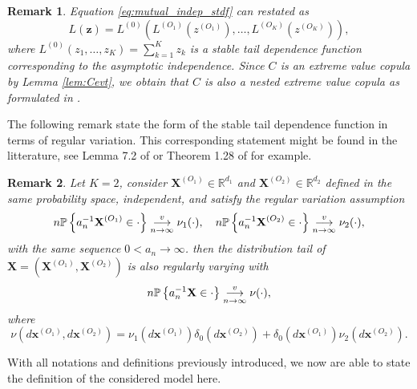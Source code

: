 \documentclass[11pt]{article}
\newtheorem{remark}{Remark}
\begin{document}
	\begin{remark}
		Equation \eqref{eq:mutual_indep_stdf} can restated as 
		\begin{equation*}
			L(\textbf{z}) = L^{(0)} \left(L^{(O_1)}\left(z^{(O_1)}\right), \dots, L^{(O_K)}\left(z^{(O_K)}\right) \right),
		\end{equation*}
		where $L^{(0)}(z_1, \dots, z_K) = \sum_{k=1}^K z_k$ is a \emph{stable tail dependence function} corresponding to the asymptotic independence. Since $C$ is an extreme value copula by Lemma \ref{lem:Cevt}, we obtain that $C$ is also a nested extreme value copula as formulated in \cite{hofert2018hierarchical}.
	\end{remark}
	The following remark state the form of the stable tail dependence function in terms of regular variation. This corresponding statement might be found in the litterature, see Lemma 7.2 of \cite{resnick2007heavy} or Theorem 1.28 of \cite{lindskog2004multivariate} for example.	
	\begin{remark}
		Let $K = 2$, consider $\textbf{X}^{(O_1)} \in \mathbb{R}^{d_1}$ and $\textbf{X}^{(O_2)} \in \mathbb{R}^{d_2}$ defined in the same probability space, independent, and satisfy the regular variation assumption
		\begin{equation*}
			n \mathbb{P}\left\{ a_n^{-1} \textbf{X}^{(O_1)} \in \cdot \right\} \overunderset{v}{n \rightarrow \infty}{\longrightarrow} \nu_1(\cdot), \quad n \mathbb{P}\left\{ a_n^{-1} \textbf{X}^{(O_2)} \in \cdot \right\} \overunderset{v}{n \rightarrow \infty}{\longrightarrow} \nu_2(\cdot),
		\end{equation*}
		with the same sequence $0< a_n \rightarrow \infty$. then the distribution tail of $\textbf{X} = (\textbf{X}^{(O_1)}, \textbf{X}^{(O_2)})$ is also regularly varying with 
		\begin{equation*}
			n \mathbb{P}\left\{ a_n^{-1} \textbf{X} \in \cdot \right\} \overunderset{v}{n \rightarrow \infty}{\longrightarrow} \nu(\cdot),
		\end{equation*}
		where
		\begin{equation*}
			\nu(d\textbf{x}^{(O_1)}, d\textbf{x}^{(O_2)}) = \nu_1 (d\textbf{x}^{(O_1)}) \delta_0(d\textbf{x}^{(O_2)}) + \delta_0(d\textbf{x}^{(O_1)}) \nu_2(d\textbf{x}^{(O_2)}).
		\end{equation*}
	\end{remark}
	
	With all notations and definitions previously introduced, we now are able to state the definition of the considered model here.
	
\end{document}
